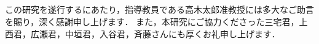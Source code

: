 \begin{center}
    \section*{}                      %
    \vspace*{-2zh}
\end{center}

この研究を遂行するにあたり，指導教員である高木太郎准教授には多大なご助言を賜り，深く感謝申し上げます．
また，本研究にご協力くださった三宅君，上西君，広瀬君，中垣君，入谷君，斉藤さんにも厚くお礼申し上げます．